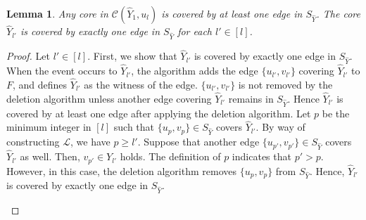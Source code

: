 \documentclass[11pt]{article}
\newtheorem{lemma}{Lemma}
\newcommand{\Cfam}{\mathcal{C}}
\newcommand{\Lfam}{\mathcal{L}}
\begin{document}
\begin{lemma}\label{lem.fy}
Any core in $\Cfam(\hat{Y}_1,u_{l})$
is covered by at least one edge in $S_{\hat{Y}}$.
The core $\hat{Y}_{l'}$ is covered by exactly one edge in $S_{\hat{Y}}$ for
 each $l' \in [l]$.
\end{lemma}
\begin{proof}
 Let $l' \in [l]$.
 First, we show that $\hat{Y}_{l'}$ is covered by exactly one edge in 
 $S_{\hat{Y}}$.
 When
 the event occurs to $\hat{Y}_{l'}$, the algorithm adds the edge
 $\{u_{l'},v_{l'}\}$
 covering $\hat{Y}_{l'}$ to $F$, 
 and defines $\hat{Y}_{l'}$ as the witness of the edge.
 $\{u_{l'},v_{l'}\}$ is not removed by the deletion algorithm
 unless another edge covering $\hat{Y}_{l'}$ remains in $S_{\hat{Y}}$.
 Hence $\hat{Y}_{l'}$ is covered by at least one edge after applying
 the deletion algorithm.
 Let $p$ be the minimum integer in $[l]$ such that
$\{u_p,v_p\} \in S_{\hat{Y}}$ covers $\hat{Y}_{l'}$.
 By way of constructing $\Lfam$, we have $p \geq l'$.
 Suppose that another edge $\{u_{p'},v_{p'}\} \in S_{\hat{Y}}$
 covers $\hat{Y}_{l'}$ as well.
 Then, $v_{p'} \in Y_{l'}$ holds.
 The definition of $p$ indicates that $p' > p$.
 However, in this case, the deletion algorithm removes
 $\{u_p,v_p\}$ from $S_{\hat{Y}}$.
 Hence, $\hat{Y}_{l'}$ is covered by exactly one edge in $S_{\hat{Y}}$.

 
\begin{figure}[t]
 \centering

\end{figure}
\end{proof}
\end{document}
